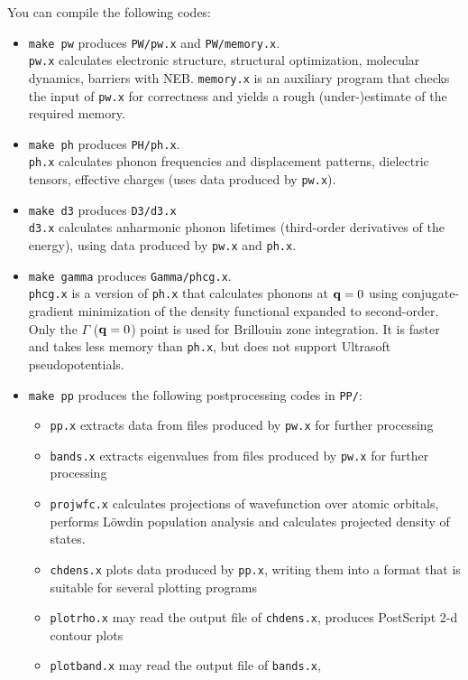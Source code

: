 \documentclass[12pt]{article}
\begin{document}
\noindent You can compile the following codes:
\begin{itemize}
\item
{\tt make pw}  produces {\tt PW/pw.x} and {\tt PW/memory.x}.\\
{\tt pw.x} calculates electronic structure, 
structural optimization, molecular dynamics, barriers with NEB.
{\tt memory.x} is an auxiliary program that checks the input of
{\tt pw.x} for correctness and yields a rough (under-)estimate of
the required memory.
\item
{\tt make ph} produces {\tt PH/ph.x}.\\
{\tt ph.x} calculates phonon frequencies and 
displacement patterns, dielectric tensors, effective charges (uses data 
produced by {\tt pw.x}).
\item
{\tt make d3} produces {\tt D3/d3.x}\\
{\tt d3.x} calculates anharmonic phonon lifetimes 
(third-order derivatives of the energy), using data produced by {\tt pw.x}
and {\tt ph.x}.
\item
{\tt make gamma} produces {\tt Gamma/phcg.x}.\\
{\tt phcg.x} is a version of {\tt ph.x} that calculates phonons
at ${\bf q}=0$ using conjugate-gradient minimization of the density 
functional expanded to second-order. Only the $\Gamma$ (${\bf q}=0$) 
point is used for Brillouin zone integration. It is faster and takes 
less memory than {\tt ph.x}, but does not support Ultrasoft 
pseudopotentials.
\item {\tt make pp} produces the following postprocessing 
codes in {\tt PP/}:
\begin{itemize}
\item {\tt pp.x} extracts data from files produced by {\tt pw.x}
for further processing
\item {\tt bands.x} extracts eigenvalues from files produced by {\tt pw.x}
for further processing
\item {\tt projwfc.x} calculates projections of wavefunction
over atomic orbitals, performs L\"owdin population analysis
and calculates projected density of states.
\item {\tt chdens.x} plots data produced by {\tt pp.x}, writing
them into a format that is suitable for several plotting programs
\item {\tt plotrho.x} may read the output file of {\tt chdens.x},
produces PostScript 2-d contour plots
\item {\tt plotband.x} may read the output file of {\tt bands.x},

\end{itemize}
\end{itemize}
\end{document}
